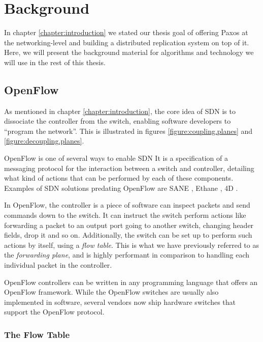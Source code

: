 \chapter{Background}
\label{chapter:background}

In chapter \ref{chapter:introduction} we stated our thesis goal of offering
Paxos at the networking-level and building a distributed replication system
on top of it.
%
Here, we will present the background material for algorithms and technology
we will use in the rest of this thesis.

\section{OpenFlow}
\label{chapter:openflow.background}

As mentioned in chapter \ref{chapter:introduction}, the core idea of
\acs{SDN} is to dissociate the controller from the switch, enabling software
developers to ``program the network''.  This is illustrated in figures
\ref{figure:coupling.planes} and \vref{figure:decoupling.planes}.

OpenFlow \cite{McKeown:2008:OEI:1355734.1355746,openflow-1.0} is one of
several ways to enable \acf{SDN}
%
It is a specification of a messaging protocol for the interaction between
a switch and controller, detailing what kind of actions that can be
performed by each of these components.
%
Examples of \ac{SDN} solutions predating OpenFlow are SANE
\cite{Casado:2006:SPA:1267336.1267346}, Ethane
\cite{Casado:2007:ETC:1282427.1282382}, 4D
\cite{Greenberg:2005:CSA:1096536.1096541}.

In OpenFlow, the controller is a piece of software can inspect packets and
send commands down to the switch.  It can instruct the switch perform actions like
forwarding a packet to an output port going to another switch, changing
header fields, drop it and so on.
%
Additionally, the switch can be set up to perform such actions by itself,
using a \textit{flow table}.  This is what we have previously referred to as
the \textit{forwarding plane}, and is highly performant in comparison to
handling each individual packet in the controller.

OpenFlow controllers can be written in any programming language that offers
an OpenFlow framework.  While the OpenFlow switches are usually also
implemented in software, several vendors now ship hardware switches that
support the OpenFlow protocol.

\subsection{The Flow Table}
\label{chapter:theory.flow.table}

